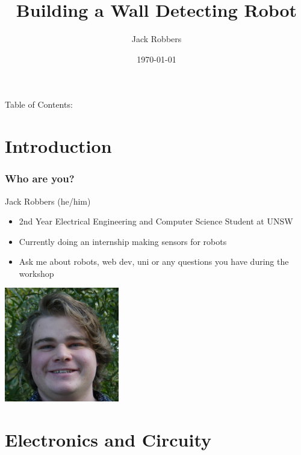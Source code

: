 \documentclass[compress]{beamer}
\title{Building a Wall Detecting Robot}
\author{Jack Robbers}
\institute{CREATE UNSW}
\date{\today}
\begin{document}
\begin{frame}
  \maketitle
  Table of Contents:
  \tableofcontents
\end{frame}

\section{Introduction}

\begin{frame}[fragile]
    \frametitle{Who are you?}
    Jack Robbers (he/him)
    \begin{itemize}
        \item 2nd Year Electrical Engineering and Computer Science Student at UNSW
        \item Currently doing an internship making sensors for robots
        \item Ask me about robots, web dev, uni or any questions you have during the workshop
    \end{itemize}

    \includegraphics[height=5cm]{pictures/jack.jpg}
\end{frame}

\section{Electronics and Circuity}
\end{document}
